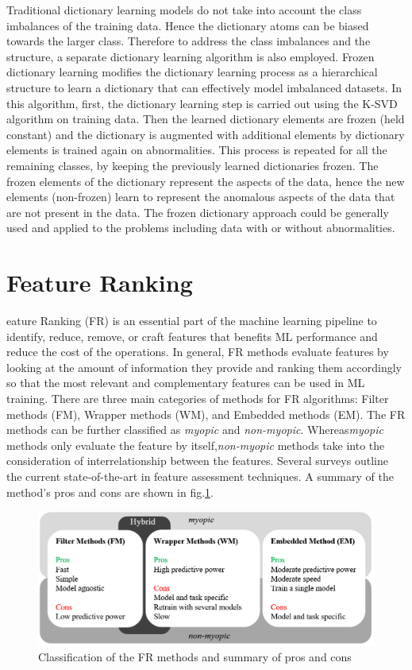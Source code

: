 Traditional dictionary learning models do not take into account the class imbalances of the training data. Hence the dictionary atoms can be biased towards the larger class. Therefore to address the class imbalances and the structure, a separate dictionary learning algorithm is also employed. Frozen dictionary learning modifies the dictionary learning process as a hierarchical structure to learn a dictionary that can effectively model imbalanced datasets\cite{Carroll2017}. In this algorithm, first, the dictionary learning step is carried out using the K-SVD algorithm on  training data. Then the learned dictionary elements are frozen (held constant) and the dictionary is augmented with additional elements by dictionary elements is trained again on abnormalities. This process is repeated for all the remaining classes, by keeping the previously learned dictionaries frozen. The frozen elements of the dictionary represent the  aspects of the data, hence the new elements (non-frozen) learn to represent the anomalous aspects of the data that are not present in the  data. The frozen dictionary approach could be generally used and applied to the problems including data with or without abnormalities.


\section{Feature Ranking}

eature Ranking (FR) is an essential part of the machine learning pipeline to identify, reduce, remove, or craft features that benefits ML performance and reduce the cost of the operations. In general, FR methods evaluate features by looking at the amount of information they provide and ranking them accordingly so that the most relevant and complementary features can be used in ML training. There are three main categories of methods for FR algorithms: Filter methods (FM), Wrapper methods (WM), and Embedded methods (EM). The FR methods can be further classified as \emph{myopic} and \emph{non-myopic}. Whereas\emph{myopic} methods only evaluate the feature by itself,\emph{non-myopic} methods take into the consideration of interrelationship between the features. Several surveys outline the current state-of-the-art in feature assessment techniques\cite{Uthman2020, Sangodiah2014, Effrosynidis2021, Jovic2015}. A summary of the method's pros and cons are shown in fig.\ref{fig: FR_methods}.

\begin{figure}[!t]
    \centering
    \includegraphics[width=12cm]{figures/eng694/FR_methods.png}
     \caption{Classification of the FR methods and summary of pros and cons}\label{fig: FR_methods}
\end{figure}


